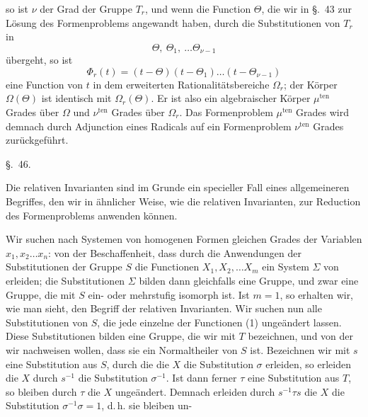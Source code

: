 so ist $\nu$ der Grad der Gruppe $T_r$, und wenn die Function $\Theta$, die
wir in \S.\ 43 zur Lösung des Formenproblems angewandt haben,
durch die Substitutionen von $T_r$ in
\[ \Theta,\ \Theta_1,\ \ldots \Theta_{\nu-1} \]
übergeht, so ist
\[ \Phi_r(t) = (t - \Theta)(t - \Theta_1) \ldots (t - \Theta_{\nu-1}) \]
eine Function von $t$ in dem erweiterten Rationalitätsbereiche
$\Omega_r$; der Körper $\Omega(\Theta)$ ist identisch mit $\Omega_r(\Theta)$. Er ist also ein algebraischer Körper $\mu^{\mathrm{ten}}$ Grades über $\Omega$ und $\nu^{\mathrm{ten}}$ Grades über $\Omega_r$.
Das Formenproblem $\mu^{\mathrm{ten}}$ Grades wird demnach durch Adjunction
eines Radicals auf ein Formenproblem $\nu^{\mathrm{ten}}$ Grades zurückgeführt.

\begin{center}
\S.\ 46.

\end{center}

Die relativen Invarianten sind im Grunde ein specieller Fall
eines allgemeineren Begriffes, den wir in ähnlicher Weise, wie
die relativen Invarianten, zur Reduction des Formenproblems
anwenden können.

Wir suchen nach Systemen von homogenen Formen gleichen
Grades der Variablen $x_1, x_2 \ldots x_n$:
von der Beschaffenheit, dass durch die Anwendungen der Substitutionen der Gruppe $S$ die Functionen $X_1, X_2, \ldots X_m$ ein
System $\Sigma$ von  erleiden; die Substitutionen $\Sigma$ bilden dann gleichfalls eine Gruppe, und zwar
eine Gruppe, die mit $S$ ein- oder mehrstufig isomorph ist. Ist
$m = 1$, so erhalten wir, wie man sieht, den Begriff der relativen
Invarianten. Wir suchen nun alle Substitutionen von $S$, die
jede einzelne der Functionen (1) ungeändert lassen. Diese Substitutionen bilden eine Gruppe, die wir mit $T$ bezeichnen, und
von der wir nachweisen wollen, dass sie ein Normaltheiler von
$S$ ist. Bezeichnen wir mit $s$ eine Substitution aus $S$, durch die
die $X$ die Substitution $\sigma$ erleiden, so erleiden die $X$ durch $s^{-1}$
die Substitution $\sigma^{-1}$. Ist dann ferner $\tau$ eine Substitution aus $T$,
so bleiben durch $\tau$ die $X$ ungeändert. Demnach erleiden durch
$s^{-1}\tau s$ die $X$ die Substitution $\sigma^{-1}\sigma = 1$, d.\,h. sie bleiben un-
